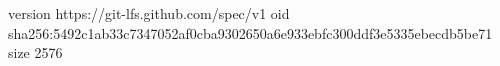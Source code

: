 version https://git-lfs.github.com/spec/v1
oid sha256:5492c1ab33c7347052af0cba9302650a6e933ebfc300ddf3e5335ebecdb5be71
size 2576
